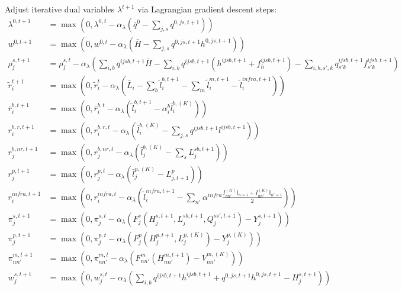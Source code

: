 \documentclass[11pt,a4paper]{article}
\newcommand{\Proj}[1]{\max\left(0, #1\right)}
\begin{document}
\begin{enumerate}
\begin{enumerate}
\begin{enumerate}
            Adjust iterative dual variables $\lambda^{t+1}$ via Lagrangian gradient descent steps:
            \begin{align}
                \lambda^{0, t+1} &= \Proj{ \lambda^{0,t} - \alpha_{\lambda} \left( \bar{q}^0 - \sum_{j,s} q^{0,js,t+1} \right) } \\
                w^{0, t+1} &= \Proj{ w^{0,t} - \alpha_{\lambda} \left( \bar{H} - \sum_{j,s} q^{0,js,t+1} h^{0,js,t+1} \right) } \\
                \rho_j^{s, t+1} &= \rho_j^{s,t} - \alpha_{\lambda} \left( \sum_{i,b} q^{ijsb,t+1} \overline{H} - \sum_{i,b} q^{ijsb,t+1}(h^{ijsb,t+1} + f^{ijsb,t+1}_h) - \sum_{i,b,s',k} q^{ijsb,t+1}_{s'k} f^{ijsb,t+1}_{s'k} \right) \\
                \tilde{r}_i^{t+1} &= \Proj{ \tilde{r}_i^t - \alpha_{\lambda} \left( \bar{L}_i - \sum_{b} \tilde{l}^{b,t+1}_i - \sum_m \tilde{l}^{m,t+1}_i - \tilde{l}_i^{infra,t+1} \right) } \\
                \bar{r}_i^{b, t+1} &= \Proj{ \bar{r}_i^{b,t} - \alpha_{\lambda} \left( \tilde{l}^{b,t+1}_i - \alpha_i^b \bar{l}^{b,(K)}_i \right) } \\
                r_{i}^{b,r, t+1} &= \Proj{ r_{i}^{b,r,t} - \alpha_{\lambda} \left( \bar{l}^{b,(K)}_i - \sum_{j,s} q^{ijsb,t+1} l^{ijsb,t+1} \right) } \\
                r_j^{b,nr, t+1} &= \Proj{ r_j^{b,nr,t} - \alpha_{\lambda} \left( \bar{l}^{b,(K)}_j - \sum_s L^{sb,t+1}_j \right) } \\
                r_j^{p, t+1} &= \Proj{ r_j^{p,t} - \alpha_{\lambda} \left( \bar{l}^{p,(K)}_j - L^p_{j,t+1} \right) } \\
                r_{i}^{infra, t+1} &= \Proj{ r_{i}^{infra,t} - \alpha_{\lambda} \left( \tilde{l}_i^{infra,t+1} - \sum_{n'} \alpha^{infra} \frac{I_{nn'}^{(K)} \mathbb{I}_{n=i} + I_{nn'}^{(K)} \mathbb{I}_{n'=i}}{2} \right) } \\
                \pi_j^{s, t+1} &= \Proj{ \pi_j^{s,t} - \alpha_{\lambda} \left( F_j^s(H_j^{s,t+1}, L_j^{sb,t+1}, Q_j^{ss',t+1}) - Y_j^{s,t+1} \right) } \\
                \pi_j^{p, t+1} &= \Proj{ \pi_j^{p,t} - \alpha_{\lambda} \left( F_j^p(H_j^{p,t+1}, L_j^{p,(K)}) - Y_j^{p,(K)} \right) } \\
                \pi_{nn'}^{m, t+1} &= \Proj{ \pi_{nn'}^{m,t} - \alpha_{\lambda} \left( F_{nn'}^m(H_{nn'}^{m,t+1}) - V_{nn'}^{m,(K)} \right) } \\
                w_j^{s, t+1} &= \Proj{ w_j^{s,t} - \alpha_{\lambda} \left( \sum_{i,b} q^{ijsb,t+1} h^{ijsb,t+1} + q^{0,js,t+1} h^{0,js,t+1} - H_j^{s,t+1} \right) } \\

\end{align}
\end{enumerate}
\end{enumerate}
\end{enumerate}
\end{document}
